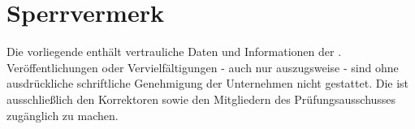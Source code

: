 \chapter*{Sperrvermerk}
Die vorliegende \arbeitstyp{} enthält vertrauliche Daten und Informationen der \ausbildungsbetrieb. Veröffentlichungen oder Vervielfältigungen - auch nur auszugsweise - sind ohne ausdrückliche schriftliche Genehmigung der Unternehmen nicht gestattet. Die \arbeitstyp{} ist ausschließlich den Korrektoren sowie den Mitgliedern des Prüfungsausschusses zugänglich zu machen.